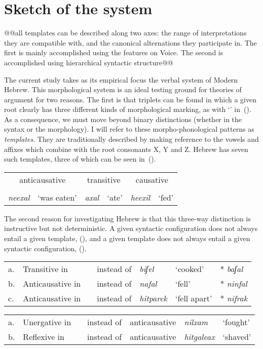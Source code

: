 		


\section{Sketch of the system} \label{intro:sketch}
@@all templates can be described along two axes: the range of interpretations they are compatible with, and the canonical alternations they participate in. The first is mainly accomplished using the features on Voice. The second is accomplished using hierarchical syntactic structure@@




The current study takes as its empirical focus the verbal system of Modern Hebrew. This morphological system is an ideal testing ground for theories of argument for two reasons. The first is that triplets can be found in which a given root clearly has three different kinds of morphological marking, as with  `' in~(\nextx). As a consequence, we must move beyond binary distinctions (whether in the syntax or the morphology). I will refer to these morpho-phonological patterns as \emph{templates}. They are traditionally described by making reference to the vowels and affixes which combine with the root consonants X, Y and Z. Hebrew has seven such templates, three of which can be seen in~(\nextx).
\ex\label{ex:alternations-heb}
	\begin{tabular}{llllll}
	\multicolumn{2}{c}{anticausative}	&	\multicolumn{2}{c}{transitive}	& \multicolumn{2}{c}{causative}\\
	\multicolumn{2}{c}{\tnif}	&	\multicolumn{2}{c}{\tkal}	& \multicolumn{2}{c}{\thif}\\
	\emph{neexal}	& `was eaten'	&	\emph{axal}	& `ate'	&	\emph{heexil}	& `fed'\\
	\end{tabular}
\xe

The second reason for investigating Hebrew is that this three-way distinction is instructive but not deterministic. A given syntactic configuration does not always entail a given template, (\nextx), and a given template does not always entail a given syntactic configuration, (\anextx).
\ex\label{ex:counter1}
	\begin{tabular}{lllllll}
	a.& Transitive in & \tpie & instead of \tkal 		& \emph{biʃel} & `cooked'	& * \emph{baʃal}\\
	b.& Anticausative in & \tkal & instead of \tnif	& \emph{nafal}	& `fell'		& * \emph{ninfal}\\
	c.& Anticausative in & \thit & instead  of \tnif & \emph{hitparek} & `fell apart'	& * \emph{nifrak}\\
	\end{tabular}
\xe
\pex\label{ex:counter2}
	\begin{tabular}{lllllll}
	a.& Unergative in & \tnif & instead of & anticausative & \emph{nilxam} & `fought'\\
	b.&	Reflexive in & \thit & instead of & anticausative & \emph{hitgaleax} & `shaved'\\
	\end{tabular}
\xe

